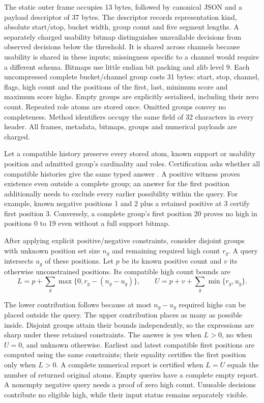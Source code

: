 \documentclass[11pt]{article}
\begin{document}
The static outer frame occupies 13 bytes, followed by canonical JSON and a payload descriptor of 37 bytes. The descriptor records representation kind, absolute start/stop, bucket width, group count and five segment lengths. A separately charged usability bitmap distinguishes unavailable decisions from observed decisions below the threshold. It is shared across channels because usability is shared in these inputs; missingness specific to a channel would require a different schema. Bitmaps use little endian bit packing and zlib level 9. Each uncompressed complete bucket/channel group costs 31 bytes: start, stop, channel, flags, high count and the positions of the first, last, minimum score and maximum score highs. Empty groups are explicitly serialized, including their zero count. Repeated role atoms are stored once. Omitted groups convey no completeness. Method identifiers occupy the same field of 32 characters in every header. All frames, metadata, bitmaps, groups and numerical payloads are charged.

Let a compatible history preserve every stored atom, known support or usability position and admitted group’s cardinality and roles. Certification asks whether all compatible histories give the same typed answer \cite{RazniewskiNutt2011,Libkin2015}. A positive witness proves existence even outside a complete group; an answer for the first position additionally needs to exclude every earlier possibility within the query. For example, known negative positions 1 and 2 plus a retained positive at 3 certify first position 3. Conversely, a complete group’s first position 20 proves no high in positions 0 to 19 even without a full support bitmap.

After applying explicit positive/negative constraints, consider disjoint groups with unknown position set size $n_g$ and remaining required high count $r_g$. A query intersects $u_g$ of these positions. Let $p$ be its known positive count and $v$ its otherwise unconstrained positions. Its compatible high count bounds are
\begin{equation}
L=p+\sum_g\max\{0,r_g-(n_g-u_g)\},\qquad U=p+v+\sum_g\min\{r_g,u_g\}.
\end{equation}


The lower contribution follows because at most $n_g-u_g$ required highs can be placed outside the query. The upper contribution places as many as possible inside. Disjoint groups attain their bounds independently, so the expressions are sharp under these retained constraints. The answer is yes when $L>0$, no when $U=0$, and unknown otherwise. Earliest and latest compatible first positions are computed using the same constraints; their equality certifies the first position only when $L>0$. A complete numerical report is certified when $L=U$ equals the number of returned original atoms. Empty queries have a complete empty report. A nonempty negative query needs a proof of zero high count. Unusable decisions contribute no eligible high, while their input status remains separately visible.
\end{document}
